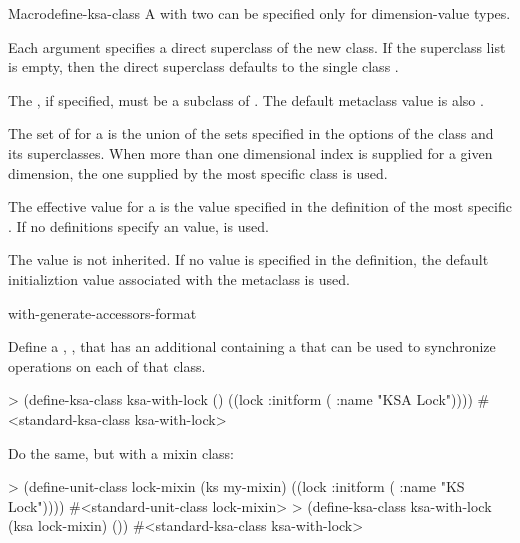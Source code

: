 \documentclass[10pt,twoside,english,pdftex]{article}
\begin{document}
\begin{functiondoc}{Macro}{define-ksa-class}
\fndescription A  with two
 can be specified only for 
dimension-value types.

%
Each  argument specifies a direct superclass of the new
class. If the superclass list is empty, then the direct superclass defaults to the
single class \textbf{}.

%
The  , if specified, must be a subclass of
\textbf{}.  The default metaclass value is
also \textbf{}.


%
%
%
The set of  for a  is the
union of the sets specified in the  options
of the class and its superclasses.  When more than one dimensional
index is supplied for a given dimension, the one supplied by the most
specific class is used.

The effective  value for a
 is the value specified in the definition of the
most specific . If no definitions specify an
 value, \nil{} is used.

The  value is not inherited.  If
no value is specified in the  definition, the
default initializtion value associated with the metaclass is used.

\begin{alsos}{with-generate-accessors-format}
\also[define-ks]
\end{alsos}

\fnexamples
Define a ,
, that has an additional 
containing a  that can be used to synchronize
operations on each  of that class.
\begin{example}
> (define-ksa-class ksa-with-lock ()
    ((lock :initform ( :name "KSA Lock"))))
#<standard-ksa-class ksa-with-lock>
\end{example}

Do the same, but with a mixin class:
\begin{example}
> (define-unit-class lock-mixin (ks my-mixin)
    ((lock :initform ( :name "KS Lock"))))
#<standard-unit-class lock-mixin>
> (define-ksa-class ksa-with-lock (ksa lock-mixin)
    ())
#<standard-ksa-class ksa-with-lock>
\end{example}

\end{functiondoc}
\end{document}
